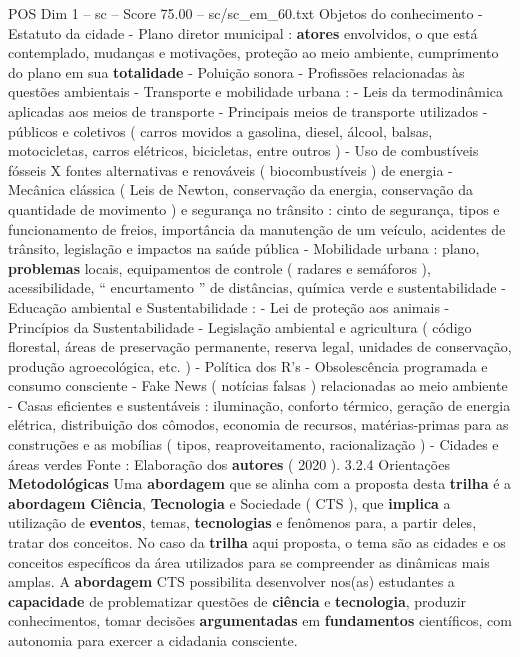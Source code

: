 \begin{textsample}{POS Dim 1 – sc – Score 75.00 – sc/sc\_em\_60.txt}
Objetos do conhecimento - Estatuto da cidade - Plano diretor municipal : \textbf{atores} envolvidos, o que está contemplado, mudanças e motivações, proteção ao meio ambiente, cumprimento do plano em sua \textbf{totalidade} - Poluição sonora - Profissões relacionadas às questões ambientais - Transporte e mobilidade urbana : - Leis da termodinâmica aplicadas aos meios de transporte - Principais meios de transporte utilizados - públicos e coletivos ( carros movidos a gasolina, diesel, álcool, balsas, motocicletas, carros elétricos, bicicletas, entre outros ) - Uso de combustíveis fósseis X fontes alternativas e renováveis ( biocombustíveis ) de energia - Mecânica clássica ( Leis de Newton, conservação da energia, conservação da quantidade de movimento ) e segurança no trânsito : cinto de segurança, tipos e funcionamento de freios, importância da manutenção de um veículo, acidentes de trânsito, legislação e impactos na saúde pública - Mobilidade urbana : plano, \textbf{problemas} locais, equipamentos de controle ( radares e semáforos ), acessibilidade, “ encurtamento ” de distâncias, química verde e sustentabilidade - Educação ambiental e Sustentabilidade : - Lei de proteção aos animais - Princípios da Sustentabilidade - Legislação ambiental e agricultura ( código florestal, áreas de preservação permanente, reserva legal, unidades de conservação, produção agroecológica, etc. ) - Política dos R’s - Obsolescência programada e consumo consciente - Fake News ( notícias falsas ) relacionadas ao meio ambiente - Casas eficientes e sustentáveis : iluminação, conforto térmico, geração de energia elétrica, distribuição dos cômodos, economia de recursos, matérias-primas para as construções e as mobílias ( tipos, reaproveitamento, racionalização ) - Cidades e áreas verdes Fonte : Elaboração dos \textbf{autores} ( 2020 ). 3.2.4 Orientações \textbf{Metodológicas} Uma \textbf{abordagem} que se alinha com a proposta desta \textbf{trilha} é a \textbf{abordagem} \textbf{Ciência}, \textbf{Tecnologia} e Sociedade ( CTS ), que \textbf{implica} a utilização de \textbf{eventos}, temas, \textbf{tecnologias} e fenômenos para, a partir deles, tratar dos conceitos.
No caso da \textbf{trilha} aqui proposta, o tema são as cidades e os conceitos específicos da área utilizados para se compreender as dinâmicas mais amplas.
A \textbf{abordagem} CTS possibilita desenvolver nos(as) estudantes a \textbf{capacidade} de problematizar questões de \textbf{ciência} e \textbf{tecnologia}, produzir conhecimentos, tomar decisões \textbf{argumentadas} em \textbf{fundamentos} científicos, com autonomia para exercer a cidadania consciente.

\end{textsample}
